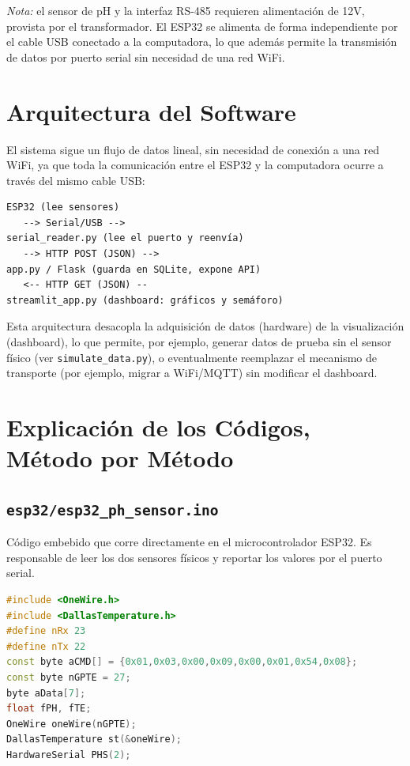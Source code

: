 \documentclass[11pt,a4paper]{article}
\begin{document}
\textit{Nota:} el sensor de pH y la interfaz RS-485 requieren
alimentación de 12V, provista por el transformador. El ESP32 se
alimenta de forma independiente por el cable USB conectado a la
computadora, lo que además permite la transmisión de datos por
puerto serial sin necesidad de una red WiFi.

\section{Arquitectura del Software}

El sistema sigue un flujo de datos lineal, sin necesidad de conexión
a una red WiFi, ya que toda la comunicación entre el ESP32 y la
computadora ocurre a través del mismo cable USB:

\begin{center}
\begin{verbatim}
ESP32 (lee sensores)
   --> Serial/USB -->
serial_reader.py (lee el puerto y reenvía)
   --> HTTP POST (JSON) -->
app.py / Flask (guarda en SQLite, expone API)
   <-- HTTP GET (JSON) --
streamlit_app.py (dashboard: gráficos y semáforo)
\end{verbatim}
\end{center}

Esta arquitectura desacopla la adquisición de datos (hardware) de la
visualización (dashboard), lo que permite, por ejemplo, generar datos
de prueba sin el sensor físico (ver \texttt{simulate\_data.py}),
o eventualmente reemplazar el mecanismo de transporte (por ejemplo,
migrar a WiFi/MQTT) sin modificar el dashboard.

\section{Explicación de los Códigos, Método por Método}

\subsection{\texttt{esp32/esp32\_ph\_sensor.ino}}

Código embebido que corre directamente en el microcontrolador ESP32.
Es responsable de leer los dos sensores físicos y reportar los
valores por el puerto serial.

\begin{lstlisting}[language=C++,caption={Declaraciones y variables globales}]
#include <OneWire.h>
#include <DallasTemperature.h>
#define nRx 23
#define nTx 22
const byte aCMD[] = {0x01,0x03,0x00,0x09,0x00,0x01,0x54,0x08};
const byte nGPTE = 27;
byte aData[7];
float fPH, fTE;
OneWire oneWire(nGPTE);
DallasTemperature st(&oneWire);
HardwareSerial PHS(2);
\end{lstlisting}
\end{document}
